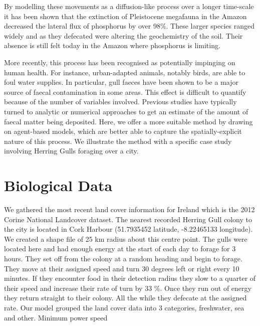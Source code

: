 \documentclass[a4paper,12pt]{article}
\begin{document}
By modelling these movements as a diffusion-like process over a longer time-scale it has been shown that the extinction of Pleistocene megafauna in the Amazon decreased the lateral flux of phosphorus by over 98\%. 
These larger species ranged widely and as they defecated were altering the geochemistry of the soil. 
Their absence is still felt today in the Amazon where phosphorus is limiting. 

More recently, this process has been recognised as potentially impinging on human health. 
For instance, urban-adapted animals, notably birds, are able to foul water supplies. 
In particular, gull faeces have been shown to be a major source of faecal contamination in some areas. 
This effect is difficult to quantify because of the number of variables involved. 
Previous studies have typically turned to analytic or numerical approaches to get an estimate of the amount of faecal matter being deposited.
Here, we offer a more suitable method by drawing on agent-based models, which are better able to capture the spatially-explicit nature of this process. 
We illustrate the method with a specific case study involving Herring Gulls foraging over a city. 


\section*{Biological Data}


We gathered the most recent land cover information for Ireland which is the 2012 Corine National Landcover dataset.  
The nearest recorded Herring Gull colony to the city is located in Cork Harbour (51.7935452 latitude, -8.22465133 longitude). 
We created a shape file of 25 km radius about this centre point. 
The gulls were located here and had enough energy at the start of each day to forage for 3 hours. 
They set off from the colony at a random heading and begin to forage. 
They move at their assigned speed and turn 30 degrees left or right every 10 minutes.
If they encounter food in their detection radius they slow to a quarter of their speed and increase their rate of turn by 33 \%.
Once they run out of energy they return straight to their colony. 
All the while they defecate at the assigned rate. 
Our model grouped the land cover data into 3 categories, freshwater, sea and other. 
Minimum power speed 
\end{document}
